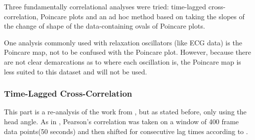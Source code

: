 \documentclass[12pt]{article}
\begin{document}
Three fundamentally correlational analyses were tried: time-lagged cross-correlation, Poincare plots and an ad hoc method based on taking the slopes of the change of shape of the data-containing ovals of Poincare plots.

One analysis commonly used with relaxation oscillators (like ECG data) is the Poincare map, not to be confused with the Poincare plot. However, because there are not clear demarcations as to where each oscillation is, the Poincare map is less suited to this dataset and will not be used\cite{physsync}.

\subsubsection{Time-Lagged Cross-Correlation}

This part is a re-analysis of the work from \cite{andrea}, but as stated before, only using the head angle. As in \cite{andrea}, Pearson's correlation was taken on a window of 400 frame data points(50 seconds) and then shifted for consecutive lag times according to \cite{framedifferencing}.
\end{document}
